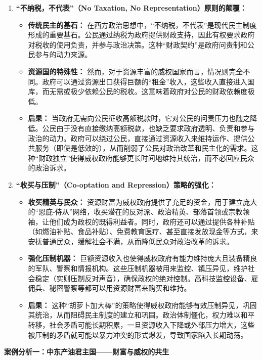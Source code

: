 \begin{enumerate}
    \item \textbf{“不纳税，不代表”（No Taxation, No Representation）原则的颠覆：}
    \begin{itemize}
        \item \textbf{传统民主的基石：} 在西方政治思想中，“不纳税，不代表”是现代民主制度形成的重要基石。公民通过纳税为政府提供财政支持，因此有权要求政府对税收的使用负责，并参与政治决策。这种“财政契约”是政府问责制和公民参与的动力来源。
        \item \textbf{资源国的特殊性：} 然而，对于资源丰富的威权国家而言，情况则完全不同。政府可以通过资源出口获得巨额的“租金”收入，这些收入直接进入国库，而无需或极少依赖公民的税收。这意味着政府对公民的财政依赖度极低。
        \item \textbf{后果：} 当政府无需向公民征收高额税款时，它对公民的问责压力也随之降低。公民由于没有直接缴纳高额税款，也缺乏要求政府透明、负责和参与政治的动力。政府可以绕过公民，直接通过资源收入来维持运作、提供公共服务（即使是低效的），从而削弱了公民对政治改革和民主化的需求。这种“财政独立”使得威权政府能够更长时间地维持其统治，而不必回应民众的政治诉求。
    \end{itemize}
    \item \textbf{“收买与压制”（Co-optation and Repression）策略的强化：}
    \begin{itemize}
        \item \textbf{收买精英与民众：} 资源财富为威权政府提供了充足的资金，用于建立庞大的“恩庇-侍从”网络，收买潜在的反对派、政治精英、部落首领或宗教领袖，让他们成为政权的既得利益者。同时，政府还可以通过提供各种补贴（如燃油补贴、食品补贴）、免费教育医疗、甚至直接发放现金等方式，来安抚普通民众，缓解社会不满，从而降低民众对政治改革的诉求。
        \item \textbf{强化压制机器：} 巨额资源收入也使得威权政府有能力维持庞大且装备精良的军队、警察和情报机构。这些压制机器被用来监控、镇压异见，维护社会稳定（实则压制反对声音），确保政权的绝对控制。高科技监控设备、雇佣兵、秘密警察等都可以用资源财富来购买和维持。
        \item \textbf{后果：} 这种“胡萝卜加大棒”的策略使得威权政府能够有效压制异见，巩固其统治，从而阻碍民主制度的建立和巩固。政治体制僵化，权力难以和平转移，社会矛盾可能长期积累，一旦资源收入下降或外部压力增大，这些被压制的矛盾就可能以暴力冲突的形式爆发，导致国家陷入长期动荡。
    \end{itemize}
\end{enumerate}

\textbf{案例分析一：中东产油君主国——财富与威权的共生}

